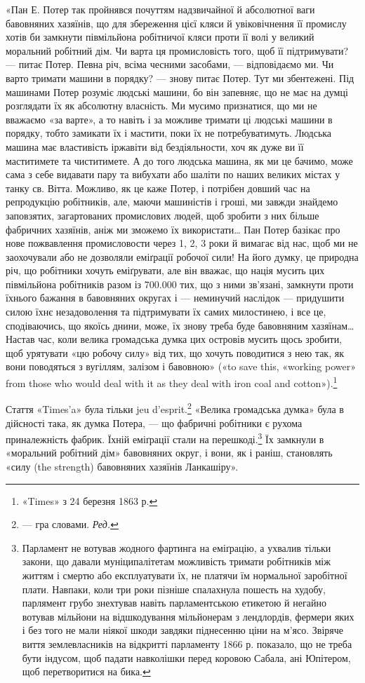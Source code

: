 «Пан Е. Потер так пройнявся почуттям надзвичайної й абсолютної
ваги бавовняних хазяїнів, що для збереження цієї кляси
й увіковічнення її промислу хотів би замкнути півмільйона робітничої
кляси проти її волі у великий моральний робітний дім.
Чи варта ця промисловість того, щоб її підтримувати? — питає
Потер. Певна річ, всіма чесними засобами, — відповідаємо ми.
Чи варто тримати машини в порядку? — знову питає Потер.
Тут ми збентежені. Під машинами Потер розуміє людські машини,
бо він запевняє, що не має на думці розглядати їх як абсолютну
власність. Ми мусимо признатися, що ми не вважаємо «за варте»,
а то навіть і за можливе тримати ці людські машини в порядку,
тобто замикати їх і мастити, поки їх не потребуватимуть. Людська
машина має властивість іржавіти від бездіяльности, хоч
як дуже ви її маститимете та чиститимете. А до того людська
машина, як ми це бачимо, може сама з себе видавати пару та вибухати
або шаліти по наших великих містах у танку св. Вітта.
Можливо, як це каже Потер, і потрібен довший час на репродукцію
робітників, але, маючи машиністів і гроші, ми завжди
знайдемо заповзятих, загартованих промислових людей, щоб
зробити з них більше фабричних хазяїнів, аніж ми зможемо їх
використати\dots{} Пан Потер базікає про нове пожвавлення промисловости
через 1, 2, 3 роки й вимагає від нас, щоб ми не заохочували
або не дозволяли еміґрації робочої сили! На його думку,
це природна річ, що робітники хочуть еміґрувати, але він вважає,
що нація мусить цих півмільйона робітників разом із \num{700.000} тих,
що з ними зв’язані, замкнути проти їхнього бажання в бавовняних
округах і — неминучий наслідок — придушити силою їхнє
незадоволення та підтримувати їх самих милостинею, і все це,
сподіваючись, що якоїсь днини, може, їх знову треба буде бавовняним
хазяїнам\dots{} Настав час, коли велика громадська думка
цих островів мусить щось зробити, щоб урятувати «цю робочу
силу» від тих, що хочуть поводитися з нею так, як вони поводяться
з вугіллям, залізом і бавовною» («to save this, «working
power» from those who would deal with it as they deal with iron
coal and cotton»).\footnote{
«Times» з 24 березня 1863 р.
}

Стаття «Times’a» була тільки jeu d’esprit.\footnote*{
— гра словами. \emph{Ред.}
} «Велика громадська
думка» була в дійсності така, як думка Потера, — що фабричні
робітники є рухома приналежність фабрик. Їхній еміґрації
стали на перешкоді.\footnote{
Парламент не вотував жодного фартинга на еміґрацію, а ухвалив
тільки закони, що давали муніципалітетам можливість тримати робітників
між життям і смертю або експлуатувати їх, не платячи їм нормальної
заробітної плати. Навпаки, коли три роки пізніше спалахнула пошесть
на худобу, парлямент грубо знехтував навіть парламентською етикетою й
негайно вотував мільйони на відшкодування мільйонерам з лендлордів,
фермери яких і без того не мали ніякої шкоди завдяки піднесенню ціни
на м’ясо. Звіряче виття землевласників на відкритті парламенту 1866 р.
показало, що не треба бути індусом, щоб падати навколішки перед коровою
Сабала, ані Юпітером, щоб перетворитися на бика.
} Їх замкнули в «моральний робітний
дім» бавовняних округ, і вони, як і раніш, становлять «силу
(the strength) бавовняних хазяїнів Ланкашіру».

